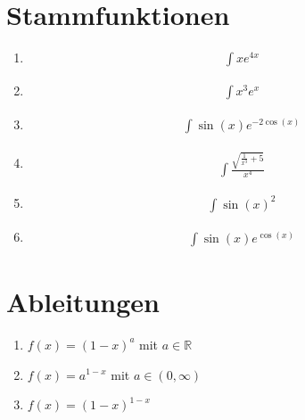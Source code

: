 \documentclass{article}
\begin{document}
\section*{Stammfunktionen}

\begin{multicols}{3}
\begin{enumerate}
    \item \begin{align*}
        \int x e^{4x}
    \end{align*}
    \item \begin{align*}
        \int x^3e^x
    \end{align*}
    \item \begin{align*}
        \int \sin(x) e^{-2\cos(x)}
    \end{align*}
    \item \begin{align*}
        \int \frac{\sqrt{\frac{1}{x^3} + 5}}{x^4}
    \end{align*}
    \item \begin{align*}\int \sin(x)^2\end{align*}
    \item \begin{align*}\int \sin(x)e^{\cos(x)}\end{align*}
\end{enumerate}
\end{multicols}

\section*{Ableitungen}

\begin{multicols}{2}
\begin{enumerate}
    \item $f(x) = (1-x)^a$ mit $a \in \mathbb{R}$
    \item $f(x) = a^{1-x}$ mit $a \in (0, \infty)$
    \item $f(x) = (1 - x)^{1 - x}$
\end{enumerate}
\end{multicols}
\end{document}
